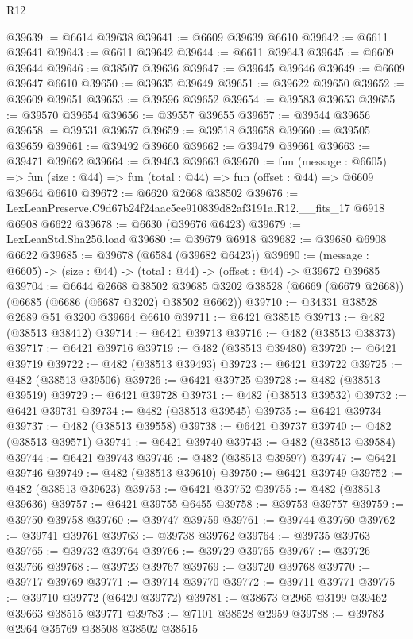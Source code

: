\begin{lexlean}{R12}
\begin{coremodule}
@39639 := @6614 @39638
@39641 := @6609 @39639 @6610
@39642 := @6611 @39641
@39643 := @6611 @39642
@39644 := @6611 @39643
@39645 := @6609 @39644
@39646 := @38507 @39636
@39647 := @39645 @39646
@39649 := @6609 @39647 @6610
@39650 := @39635 @39649
@39651 := @39622 @39650
@39652 := @39609 @39651
@39653 := @39596 @39652
@39654 := @39583 @39653
@39655 := @39570 @39654
@39656 := @39557 @39655
@39657 := @39544 @39656
@39658 := @39531 @39657
@39659 := @39518 @39658
@39660 := @39505 @39659
@39661 := @39492 @39660
@39662 := @39479 @39661
@39663 := @39471 @39662
@39664 := @39463 @39663
@39670 := fun (message : @6605) =>
  fun (size : @44) => fun (total : @44) => fun (offset : @44) => @6609 @39664 @6610
@39672 := @6620 @2668 @38502
@39676 := LexLeanPreserve.C9d67b24f24aac5ce910839d82af3191a.R12.__fits_17 @6918 @6908 @6622
@39678 := @6630 (@39676 @6423)
@39679 := LexLeanStd.Sha256.load
@39680 := @39679 @6918
@39682 := @39680 @6908 @6622
@39685 := @39678 (@6584 (@39682 @6423))
@39690 := (message : @6605) -> (size : @44) -> (total : @44) -> (offset : @44) -> @39672 @39685
@39704 := @6644
    @2668
    @38502
    @39685
    @3202
    @38528
    (@6669 (@6679 @2668))
    (@6685 (@6686 (@6687 @3202) @38502 @6662))
@39710 := @34331 @38528 @2689 @51 @3200 @39664 @6610
@39711 := @6421 @38515
@39713 := @482 (@38513 @38412)
@39714 := @6421 @39713
@39716 := @482 (@38513 @38373)
@39717 := @6421 @39716
@39719 := @482 (@38513 @39480)
@39720 := @6421 @39719
@39722 := @482 (@38513 @39493)
@39723 := @6421 @39722
@39725 := @482 (@38513 @39506)
@39726 := @6421 @39725
@39728 := @482 (@38513 @39519)
@39729 := @6421 @39728
@39731 := @482 (@38513 @39532)
@39732 := @6421 @39731
@39734 := @482 (@38513 @39545)
@39735 := @6421 @39734
@39737 := @482 (@38513 @39558)
@39738 := @6421 @39737
@39740 := @482 (@38513 @39571)
@39741 := @6421 @39740
@39743 := @482 (@38513 @39584)
@39744 := @6421 @39743
@39746 := @482 (@38513 @39597)
@39747 := @6421 @39746
@39749 := @482 (@38513 @39610)
@39750 := @6421 @39749
@39752 := @482 (@38513 @39623)
@39753 := @6421 @39752
@39755 := @482 (@38513 @39636)
@39757 := @6421 @39755 @6455
@39758 := @39753 @39757
@39759 := @39750 @39758
@39760 := @39747 @39759
@39761 := @39744 @39760
@39762 := @39741 @39761
@39763 := @39738 @39762
@39764 := @39735 @39763
@39765 := @39732 @39764
@39766 := @39729 @39765
@39767 := @39726 @39766
@39768 := @39723 @39767
@39769 := @39720 @39768
@39770 := @39717 @39769
@39771 := @39714 @39770
@39772 := @39711 @39771
@39775 := @39710 @39772 (@6420 @39772)
@39781 := @38673 @2965 @3199 @39462 @39663 @38515 @39771
@39783 := @7101 @38528 @2959
@39788 := @39783 @2964 @35769 @38508 @38502 @38515

\end{coremodule}
\end{lexlean}
